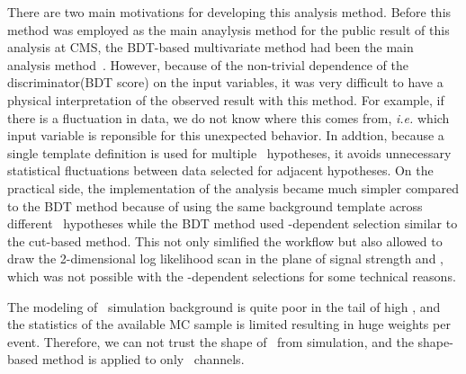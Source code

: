 There are two main motivations for developing this analysis method. 
Before this method was employed as the main anaylysis method for the 
public result of this analysis at CMS, the BDT-based multivariate method 
had been the main analysis method~\cite{CMS-PAS-HIG-12-038}. However, because of 
the non-trivial dependence of the discriminator(BDT score)
on the input variables, it was very difficult to have a
physical interpretation of the observed result with this method. 
For example, if there is a fluctuation in data, we do not know where this comes from, 
\textit{i.e.} which input variable is reponsible for this unexpected 
behavior. In addtion, because a single template definition is used for multiple 
\mHi\ hypotheses, it avoids unnecessary statistical fluctuations between data selected 
for adjacent hypotheses.
On the practical side, the implementation of the 
analysis became much simpler compared to the BDT method because of using 
the same background template across different \mHi\ hypotheses
while the BDT method used \mHi-dependent selection similar to the cut-based 
method. This not only simlified the workflow but also allowed to draw 
the 2-dimensional log likelihood scan in the plane of 
signal strength and \mHi, which was not possible with the \mHi-dependent 
selections for some technical reasons. 

The modeling of \dyll\ simulation background is quite poor in the tail of high \met,
and the statistics of the available MC sample is limited resulting in huge weights
per event. Therefore, we can not trust the shape of \dyll\ from simulation, and  
the shape-based method is applied to only \DF\ channels. 


